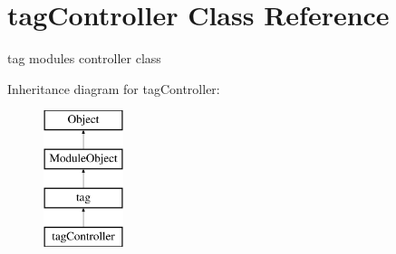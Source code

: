 \hypertarget{classtagController}{}\section{tag\+Controller Class Reference}
\label{classtagController}


tag module\textquotesingle{}s controller class  


Inheritance diagram for tag\+Controller\+:\begin{figure}[H]
\begin{center}
\leavevmode
\includegraphics[height=4.000000cm]{classtagController}
\end{center}
\end{figure}
